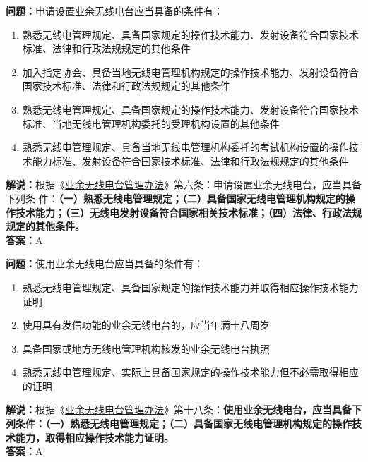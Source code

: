 \textbf{问题：}申请设置业余无线电台应当具备的条件有：
\begin{enumerate}[label=\Alph*), leftmargin=1.5cm]
	\item 熟悉无线电管理规定、具备国家规定的操作技术能力、发射设备符合国家技术标准、法律和行政法规规定的其他条件
	\item 加入指定协会、具备当地无线电管理机构规定的操作技术能力、发射设备符合国家技术标准、法律和行政法规规定的其他条件
	\item 熟悉无线电管理规定、具备国家规定的操作技术能力、发射设备符合国家技术标准、当地无线电管理机构委托的受理机构设置的其他条件
	\item 熟悉无线电管理规定、具备当地无线电管理机构委托的考试机构设置的操作技术能力标准、发射设备符合国家技术标准、法律和行政法规规定的其他条件
\end{enumerate}
\textbf{解说：}根据《\href{https://www.miit.gov.cn/jgsj/zfs/bmgz/art/2020/art_147b69815b3641caad9047735f94c860.html}{业余无线电台管理办法}》第六条：申请设置业余无线电台，应当具备下列条
件：\textbf{（一）熟悉无线电管理规定；（二）具备国家无线电管理机构规定的操作技术能力；（三）无线电发射设备符合国家相关技术标准；（四）法律、行政法规规定的其他条件。}\\\textbf{答案：}A

\textbf{问题：}使用业余无线电台应当具备的条件有：
\begin{enumerate}[label=\Alph*), leftmargin=1.5cm]
	\item 熟悉无线电管理规定、具备国家规定的操作技术能力并取得相应操作技术能力证明
	\item 使用具有发信功能的业余无线电台的，应当年满十八周岁
	\item 具备国家或地方无线电管理机构核发的业余无线电台执照
	\item 熟悉无线电管理规定、实际上具备国家规定的操作技术能力但不必需取得相应的证明
\end{enumerate}
\textbf{解说：}根据《\href{https://www.miit.gov.cn/jgsj/zfs/bmgz/art/2020/art_147b69815b3641caad9047735f94c860.html}{业余无线电台管理办法}》第十八条：\textbf{使用业余无线电台，应当具备下列条件：（一）熟悉无线电管理规定；（二）具备国家无线电管理机构规定的操作技术能力，取得相应操作技术能力证明。}\\\textbf{答案：}A

